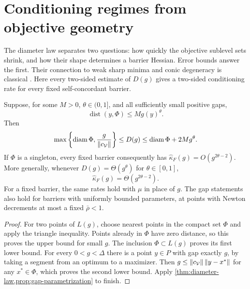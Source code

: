 \section{Conditioning regimes from objective geometry}
\label{sec:classifications}

The diameter law separates two questions: how quickly the objective
sublevel sets shrink, and how their shape determines a barrier Hessian.
Error bounds answer the first. Their connection to weak sharp minima and
conic degeneracy is classical \citep{burkeferris1993,sturm2000,lourenco2021}.
Here every two-sided estimate of $D(g)$ gives a two-sided conditioning
rate for every fixed self-concordant barrier.

\begin{corollary}
\label{cor:error-dictionary}
Suppose, for some $M>0$, $\theta\in(0,1]$, and all sufficiently small
positive gaps,
\begin{equation}
 \operatorname{dist}(y,\Phi)\leq M g(y)^\theta.
 \label{eq:error-bound}
\end{equation}
Then
\begin{equation}
 \max\left\{\operatorname{diam}\Phi,\frac{g}{\left\lVert c_{\mathcal V}\right\rVert}\right\}
 \leq D(g)\leq\operatorname{diam}\Phi+2Mg^\theta.
 \label{eq:error-diameter}
\end{equation}
If $\Phi$ is a singleton, every fixed barrier consequently has
$\widehat\kappa_F(g)=O(g^{2\theta-2})$.
More generally, whenever $D(g)=\Theta(g^\theta)$ for
$\theta\in[0,1]$,
\begin{equation}
 \widehat\kappa_F(g)=\Theta(g^{2\theta-2}).
 \label{eq:attained-dictionary}
\end{equation}
For a fixed barrier, the same rates hold with $\mu$ in place of $g$.
The gap statements also hold for barriers with uniformly bounded
parameters, at points with Newton decrements at most a fixed $\bar\rho<1$.
\end{corollary}

\begin{proof}
For two points of $L(g)$, choose nearest points in the compact set
$\Phi$ and apply the triangle inequality. Points already in $\Phi$ have zero
distance, so this proves the upper bound for small $g$.
The inclusion $\Phi\subset L(g)$ proves its first lower bound.
For every $0<g<\Delta$ there is a point $y\in P$ with gap exactly $g$,
by taking a segment from an optimum to a maximizer. Then
$g\leq\left\lVert c_{\mathcal V}\right\rVert\left\lVert y-x^*\right\rVert$ for any $x^*\in\Phi$,
which proves the second lower bound. Apply
\cref{thm:diameter-law,prop:gap-parametrization} to finish.
\end{proof}

